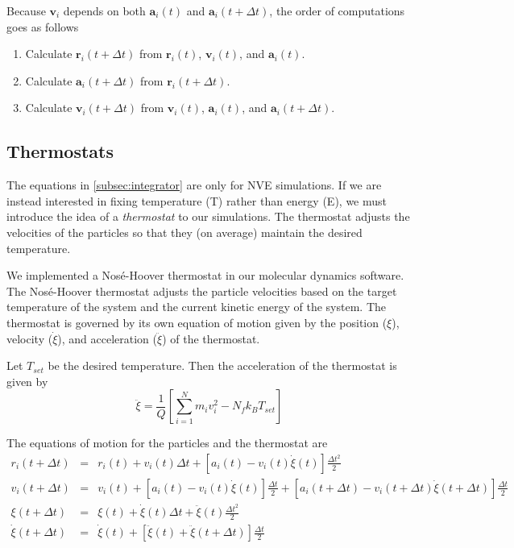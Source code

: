 \documentclass[12pt]{article}
\begin{document}
Because $\mathbf{v}_i$ depends on both $\mathbf{a}_i(t)$ and $\mathbf{a}_i(t+\Delta t)$, the order of computations goes as follows 
\begin{enumerate}
\item Calculate $\mathbf{r}_i(t + \Delta t)$ from $\mathbf{r}_i(t)$, $\mathbf{v}_i(t)$, and $\mathbf{a}_i(t)$.
\item Calculate $\mathbf{a}_i(t + \Delta t)$ from $\mathbf{r}_i(t + \Delta t)$. 
\item Calculate $\mathbf{v}_i(t + \Delta t)$ from $\mathbf{v}_i(t)$, $\mathbf{a}_i(t)$, and $\mathbf{a}_i(t + \Delta t)$. 
\end{enumerate}

\subsection{Thermostats} \label{subsec:thermostat}
The equations in \ref{subsec:integrator} are only for NVE simulations.
%
If we are instead interested in fixing temperature (T) rather than energy (E), we must introduce the idea of a {\em thermostat} to our simulations.
%
The thermostat adjusts the velocities of the particles so that they (on average) maintain the desired temperature.

We implemented a Nos\'{e}-Hoover thermostat in our molecular dynamics software.
%
The Nos\'{e}-Hoover thermostat adjusts the particle velocities based on the target temperature of the system and the current kinetic energy of the system. 
%
The thermostat is governed by its own equation of motion given by the position ($\xi$), velocity ($\dot{\xi}$), and acceleration ($\ddot{\xi}$) of the thermostat.

Let $T_{set}$ be the desired temperature.
%
Then the acceleration of the thermostat is given by
\begin{equation}
\ddot{\xi} = \frac{1}{Q} \left[ \sum_{i=1}^{N} m_i v_i^2 - N_f k_B T_{set} \right]
\end{equation}

The equations of motion for the particles and the thermostat are
\begin{eqnarray}
r_i(t + \Delta t) &=& r_i(t) + v_i(t) \Delta t + \left[ a_i(t) - v_i(t)\dot{\xi}(t) \right] \frac{\Delta t^2}{2}\\
v_i(t + \Delta t) &=& v_i(t) + \left[ a_i(t) - v_i(t) \dot{\xi}(t) \right] \frac{\Delta t}{2} + \left[a_i(t + \Delta t)  - v_i(t + \Delta t) \dot{\xi}(t + \Delta t) \right] \frac{\Delta t}{2} \\
\xi(t + \Delta t) & = & \xi(t) + \dot{\xi}(t) \Delta t + \ddot{\xi}(t) \frac{\Delta t^2 }{2} \\
\dot{\xi}(t + \Delta t)  & = & \dot{\xi}(t) + \left[ \ddot{\xi}(t) + \ddot{\xi} (t + \Delta t)  \right] \frac{\Delta t}{2}
\end{eqnarray}
\end{document}
